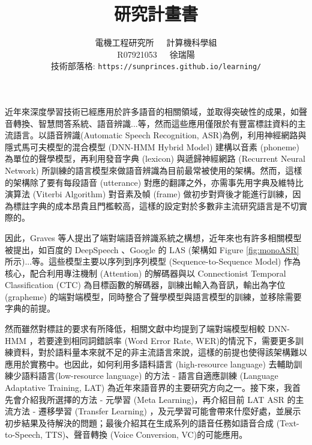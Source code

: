 \documentclass[12pt,UTF8,fntef]{article}
\title{研究計畫書}
\author{電機工程研究所~~~計算機科學組\\R07921053~~~徐瑞陽 \\ 技術部落格: \texttt{https://sunprinces.github.io/learning/}}
\date{}
\begin{document}
\maketitle

近年來深度學習技術已經應用於許多語音的相關領域，並取得突破性的成果，如聲音轉換、智慧問答系統、語音辨識...等，然而這些應用僅限於有豐富標註資料的主流語言。以語音辨識(Automatic Speech Recognition, ASR)為例，利用神經網路與隱式馬可夫模型的混合模型 (DNN-HMM Hybrid Model) 建構以音素 (phoneme) 為單位的聲學模型，再利用發音字典 (lexicon) 與遞歸神經網路 (Recurrent Neural Network) 所訓練的語言模型來做語音辨識為目前最常被使用的架構。然而，這樣的架構除了要有每段語音 (utterance) 對應的翻譯之外，亦需事先用字典及維特比演算法 (Viterbi Algorithm) 對音素及幀 (frame) 做初步對齊後才能進行訓練，因為標註字典的成本昂貴且門檻較高，這樣的設定對於多數非主流研究語言是不切實際的。

因此，Graves 等人提出了端對端語音辨識系統之構想\cite{graves2014towards}，近年來也有許多相關模型被提出，如百度的 DeepSpeech \cite{hannun2014deep}、Google 的 LAS \cite{chan2016listen} (架構如 Figure \ref{fig:monoASR} 所示)...等。這些模型主要以序列到序列模型 (Sequence-to-Sequence Model) 作為核心，配合利用專注機制 (Attention) 的解碼器與以 Connectionist Temporal Classification (CTC) 為目標函數的解碼器，訓練出輸入為音訊，輸出為字位 (grapheme) 的端對端模型，同時整合了聲學模型與語言模型的訓練，並移除需要字典的前提。

然而雖然對標註的要求有所降低，相關文獻中均提到了端對端模型相較 DNN-HMM ，若要達到相同詞錯誤率 (Word Error Rate, WER)的情況下，需要更多訓練資料，對於語料量本來就不足的非主流語言來說，這樣的前提也使得該架構難以應用於實務中。也因此，如何利用多語料語言 (high-resource language) 去輔助訓練少語料語言(low-resource language) 的方法 - 語言自適應訓練 (Language Adaptative Training, LAT) 為近年來語音界的主要研究方向之一。接下來，我首先會介紹我所選擇的方法 - 元學習 (Meta Learning)，再介紹目前 LAT ASR 的主流方法 - 遷移學習 (Transfer Learning) ，及元學習可能會帶來什麼好處，並展示初步結果及待解決的問題；最後介紹其在生成系列的語音任務如語音合成 (Text-to-Speech, TTS)、聲音轉換 (Voice Conversion, VC)的可能應用。


\newpage
\end{document}
